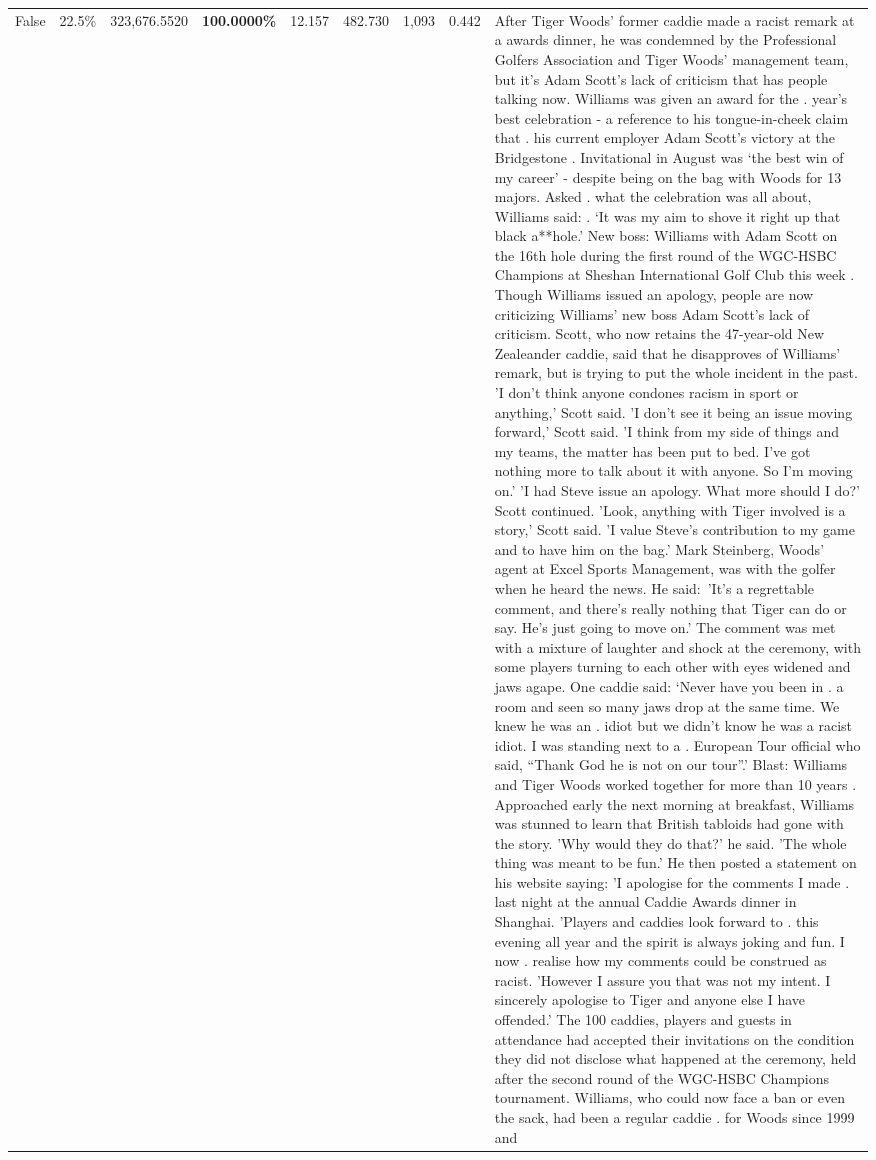 \begin{table}[H]
\begin{tabular}{lllrlllll}
False & 22.5\% & 323,676.5520 & \bfseries \color{red} 100.0000\% & 12.157 & 482.730 & 1,093 & 0.442 & After Tiger Woods' former caddie made a racist remark at a awards dinner, he was condemned by the Professional Golfers Association and Tiger Woods' management team, but it's Adam Scott's lack of criticism that has people talking now. Williams was given an award for the . year’s best celebration - a reference to his tongue-in-cheek claim that . his current employer Adam Scott’s victory at the Bridgestone . Invitational in August was ‘the best win of my career’ - despite being on the bag with Woods for 13 majors. Asked . what the celebration was all about, Williams said: . ‘It was my aim to shove it right up that black a**hole.’ New boss: Williams with Adam Scott  on the 16th hole during the first round of the WGC-HSBC Champions at Sheshan International Golf Club this week . Though Williams issued an apology, people are now criticizing Williams' new boss Adam Scott's lack of criticism. Scott, who now retains the 47-year-old New Zealeander caddie, said that he disapproves of Williams' remark, but is trying to put the whole incident in the past. 'I don't think anyone condones racism in sport or anything,' Scott said. 'I don't see it being an issue moving forward,' Scott said. 'I think from my side of things and my teams, the matter has been put to bed. I've got nothing more to talk about it with anyone. So I'm moving on.' 'I had Steve issue an apology. What more should I do?' Scott continued. 'Look, anything with Tiger involved is a story,' Scott said. 'I value Steve's contribution to my game and to have him on the bag.' Mark Steinberg, Woods' agent at Excel Sports Management, was with the golfer when he heard the news. He said: 'It's a regrettable comment, and there's really nothing that Tiger can do or say. He's just going to move on.' The comment was met with a mixture of laughter and shock at the ceremony, with some players turning to each other with eyes widened and jaws agape. One caddie said: ‘Never have you been in . a room and seen so many jaws drop at the same time. We knew he was an . idiot but we didn’t know he was a racist idiot. I was standing next to a . European Tour official who said, “Thank God he is not on our tour”.’ Blast: Williams and Tiger Woods worked together for more than 10 years . Approached early the next morning at breakfast, Williams was stunned to learn that British tabloids had gone with the story. 'Why would they do that?' he said. 'The whole thing was meant to be fun.' He then posted a statement on his website saying: 'I apologise for the comments I made . last night at the annual Caddie Awards dinner in Shanghai. 'Players and caddies look forward to . this evening all year and the spirit is always joking and fun. I now . realise how my comments could be construed as racist. 'However I assure you that was not my intent. I sincerely apologise to Tiger and anyone else I have offended.' The 100 caddies, players and guests in attendance had accepted their invitations on the condition they did not disclose what happened at the ceremony, held after the second round of the WGC-HSBC Champions tournament. Williams, who could now face a ban or even the sack, had been a regular caddie . for Woods since 1999 and 
\end{tabular}
\end{table}
